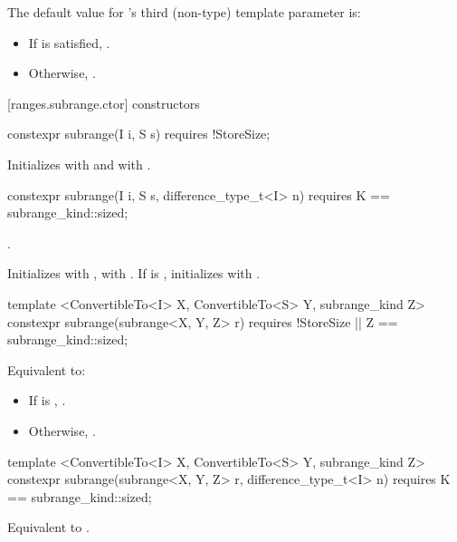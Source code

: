 \pnum
The default value for 's third (non-type) template parameter is:
\begin{itemize}
\item If  is satisfied, .
\item Otherwise, .
\end{itemize}

[ranges.subrange.ctor]{ constructors}

%
\begin{itemdecl}
constexpr subrange(I i, S s) requires !StoreSize;
\end{itemdecl}

\begin{itemdescr}
\pnum
\effects Initializes  with  and  with
.
\end{itemdescr}

%
\begin{itemdecl}
constexpr subrange(I i, S s, difference_type_t<I> n)
  requires K == subrange_kind::sized;
\end{itemdecl}

\begin{itemdescr}
\pnum
\requires {}.

\pnum
\effects Initializes  with ,  with
. If  is , initializes  with
.
\end{itemdescr}

\begin{removedblock}
\begin{itemdecl}
template <ConvertibleTo<I> X, ConvertibleTo<S> Y, subrange_kind Z>
constexpr subrange(subrange<X, Y, Z> r)
  requires !StoreSize || Z == subrange_kind::sized;
\end{itemdecl}

\begin{itemdescr}
\pnum
\effects Equivalent to:
\begin{itemize}
\item If  is ,
.
\item Otherwise, .
\end{itemize}
\end{itemdescr}

\begin{itemdecl}
template <ConvertibleTo<I> X, ConvertibleTo<S> Y, subrange_kind Z>
constexpr subrange(subrange<X, Y, Z> r, difference_type_t<I> n)
  requires K == subrange_kind::sized;
\end{itemdecl}

\begin{itemdescr}
\pnum
\effects Equivalent to .
\end{itemdescr}
\end{removedblock}

